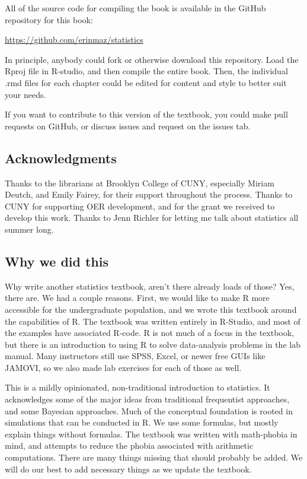 \documentclass[
]{book}
\begin{document}
All of the source code for compiling the book is available in the GitHub repository for this book:

\url{https://github.com/erinmaz/statistics}

In principle, anybody could fork or otherwise download this repository. Load the Rproj file in R-studio, and then compile the entire book. Then, the individual .rmd files for each chapter could be edited for content and style to better suit your needs.

If you want to contribute to this version of the textbook, you could make pull requests on GitHub, or discuss issues and request on the issues tab.

\subsection{Acknowledgments}\label{acknowledgments}

Thanks to the librarians at Brooklyn College of CUNY, especially Miriam Deutch, and Emily Fairey, for their support throughout the process. Thanks to CUNY for supporting OER development, and for the grant we received to develop this work. Thanks to Jenn Richler for letting me talk about statistics all summer long.

\subsection{Why we did this}\label{why-we-did-this}

Why write another statistics textbook, aren't there already loads of those? Yes, there are. We had a couple reasons. First, we would like to make R more accessible for the undergraduate population, and we wrote this textbook around the capabilities of R. The textbook was written entirely in R-Studio, and most of the examples have associated R-code. R is not much of a focus in the textbook, but there is an introduction to using R to solve data-analysis problems in the lab manual. Many instructors still use SPSS, Excel, or newer free GUIs like JAMOVI, so we also made lab exercises for each of those as well.

This is a mildly opinionated, non-traditional introduction to statistics. It acknowledges some of the major ideas from traditional frequentist approaches, and some Bayesian approaches. Much of the conceptual foundation is rooted in simulations that can be conducted in R. We use some formulas, but mostly explain things without formulas. The textbook was written with math-phobia in mind, and attempts to reduce the phobia associated with arithmetic computations. There are many things missing that should probably be added. We will do our best to add necessary things as we update the textbook.
\end{document}

